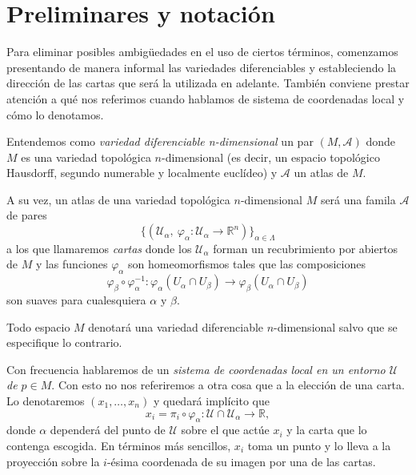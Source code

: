 
\section{Preliminares y notación}

Para eliminar posibles ambigüedades en el uso de ciertos términos, comenzamos presentando de manera informal las variedades diferenciables y estableciendo la dirección de las cartas que será la utilizada en adelante. También conviene prestar atención a qué nos referimos cuando hablamos de sistema de coordenadas local y cómo lo denotamos.

Entendemos como \textit{variedad diferenciable n-dimensional} un par $(M,\mathcal{A})$ donde $M$ es una variedad topológica $n$-dimensional (es decir, un espacio topológico Hausdorff, segundo numerable y localmente euclídeo) y $\mathcal{A}$ un atlas de $M$. 

A su vez, un atlas de una variedad topológica $n$-dimensional $M$ será una famila $\mathcal{A}$ de pares
\begin{equation*}
    \{(\mathcal{U}_{\alpha}, ~\varphi_{\alpha}:\mathcal{U}_{\alpha}\to \mathbb{R}^n)\}_{\alpha\in\Lambda}
\end{equation*}
a los que llamaremos \textit{cartas} donde los $\mathcal{U}_{\alpha}$ forman un recubrimiento por abiertos de $M$ y las funciones $\varphi_{\alpha}$ son homeomorfismos tales que las composiciones 
\begin{equation*}
    \varphi_\beta \circ \varphi_\alpha^{-1} : \varphi_\alpha (U_\alpha \cap U_\beta)\to \varphi_\beta (U_\alpha \cap U_\beta)
\end{equation*}
son suaves para cualesquiera $\alpha$ y $\beta$.

Todo espacio $M$ denotará una variedad diferenciable $n$-dimensional salvo que se especifique lo contrario.

\bigskip

Con frecuencia hablaremos de un \textit{sistema de coordenadas local en un entorno $\mathcal{U}$ de $p\in M$}. Con esto no nos referiremos a otra cosa que a la elección de una carta. Lo denotaremos $(x_{1}, \dots ,x_{n})$ y quedará implícito que 
\begin{equation*}
    x_i = \pi_i \circ \varphi_{\alpha} : \mathcal{U}\cap\mathcal{U}_{\alpha} \to \mathbb{R},
\end{equation*}
donde $\alpha$ dependerá del punto de $\mathcal{U}$ sobre el que actúe $x_i$ y la carta que lo contenga escogida. En términos más sencillos, $x_i$ toma un punto y lo lleva a la proyección sobre la $i$-ésima coordenada de su imagen por una de las cartas.

